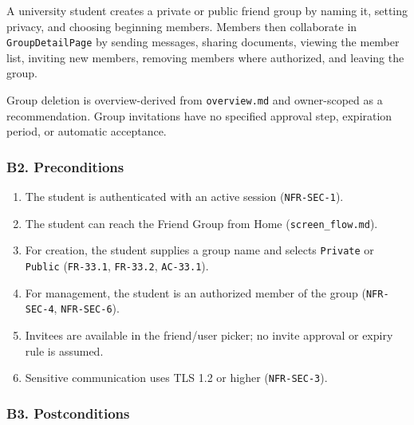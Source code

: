 \documentclass[12pt]{article}
\begin{document}
A university student creates a private or public friend group by naming it, setting privacy, and choosing beginning members. Members then collaborate in \texttt{GroupDetailPage} by sending messages, sharing documents, viewing the member list, inviting new members, removing members where authorized, and leaving the group.
\par\medskip

Group deletion is overview-derived from \texttt{overview.md} and owner-scoped as a recommendation. Group invitations have no specified approval step, expiration period, or automatic acceptance.
\par\medskip

\hypertarget{sec:b2-preconditions}{}
\subsubsection*{B2. Preconditions}
\par\medskip

\begin{enumerate}
\item The student is authenticated with an active session (\texttt{NFR-SEC-1}).
\item The student can reach the Friend Group from Home (\texttt{screen\_flow.md}).
\item For creation, the student supplies a group name and selects \texttt{Private} or \texttt{Public} (\texttt{FR-33.1}, \texttt{FR-33.2}, \texttt{AC-33.1}).
\item For management, the student is an authorized member of the group (\texttt{NFR-SEC-4}, \texttt{NFR-SEC-6}).
\item Invitees are available in the friend/user picker; no invite approval or expiry rule is assumed.
\item Sensitive communication uses TLS 1.2 or higher (\texttt{NFR-SEC-3}).
\end{enumerate}
\par\medskip

\hypertarget{sec:b3-postconditions}{}
\subsubsection*{B3. Postconditions}
\par\medskip
\end{document}
